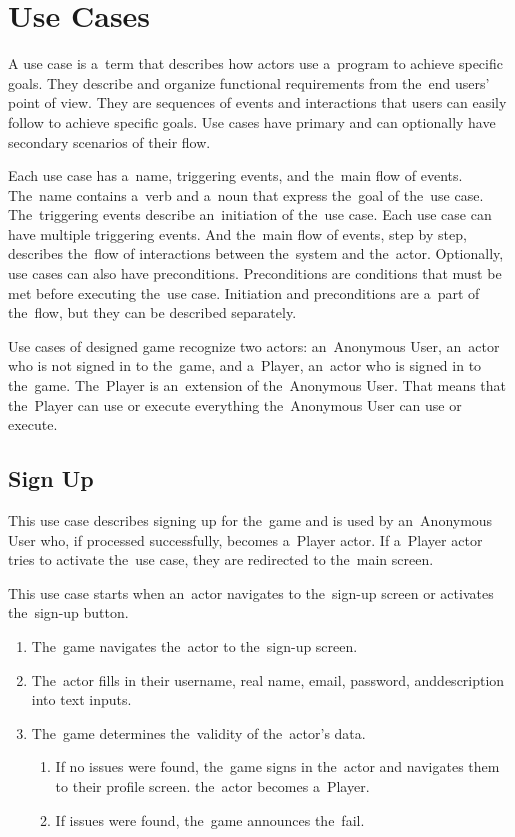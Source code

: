 \section{Use Cases}

A use case is a~term that describes how actors use a~program to achieve specific goals.
They describe and organize functional requirements from the~end users' point of view.
They are sequences of events and interactions that users can easily follow to achieve specific goals.
Use cases have primary and can optionally have secondary scenarios of their flow.

Each use case has a~name, triggering events, and the~main flow of events.
The~name contains a~verb and a~noun that express the~goal of the~use case.
The~triggering events describe an~initiation of the~use case.
Each use case can have multiple triggering events.
And the~main flow of events, step by step, describes the~flow of interactions between the~system and the~actor.
Optionally, use cases can also have preconditions.
Preconditions are conditions that must be met before executing the~use case.
Initiation and preconditions are a~part of the~flow, but they can be described separately.

Use cases of designed game recognize two actors: an~Anonymous User, an~actor who is not signed in to the~game, and a~Player, an~actor who is signed in to the~game.
The~Player is an~extension of the~Anonymous User.
That means that the~Player can use or execute everything the~Anonymous User can use or execute.

\let\oldsubsection=\thesubsection
\renewcommand\thesubsection{UC\arabic{subsection}}

\pagebreak
\subsection{Sign Up}

This use case describes signing up for the~game and is used by an~Anonymous User who, if processed successfully, becomes a~Player actor. If a~Player actor tries to activate the~use case, they are redirected to the~main screen.

This use case starts when an~actor navigates to the~sign-up screen or activates the~sign-up button.

\begin{enumerate}
    \item The~game navigates the~actor to the~sign-up screen.
    \item The~actor fills in their username, real name, email, password, and\linebreak{}description into text inputs.
    \item The~game determines the~validity of the~actor's data.
    \begin{enumerate}
        \item If no issues were found, the~game signs in the~actor and navigates them to their profile screen.
        the~actor becomes a~Player.
        \item If issues were found, the~game announces the~fail.
    \end{enumerate}
\end{enumerate}


